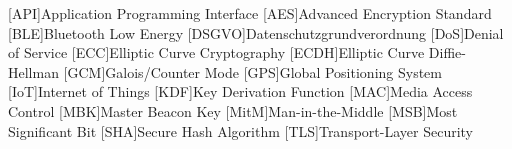 \begin{acronym}[AAAAA]

    [API]{Application Programming Interface}
    [AES]{Advanced Encryption Standard}
    [BLE]{Bluetooth Low Energy}
    [DSGVO]{Datenschutzgrundverordnung}
    [DoS]{Denial of Service}
    [ECC]{Elliptic Curve Cryptography}
    [ECDH]{Elliptic Curve Diffie-Hellman}
    [GCM]{Galois/Counter Mode}
    [GPS]{Global Positioning System}
    [IoT]{Internet of Things}
    [KDF]{Key Derivation Function}
    [MAC]{Media Access Control}
    [MBK]{Master Beacon Key}
    [MitM]{Man-in-the-Middle}
    [MSB]{Most Significant Bit}
    [SHA]{Secure Hash Algorithm}
    [TLS]{Transport-Layer Security}
    
\end{acronym}